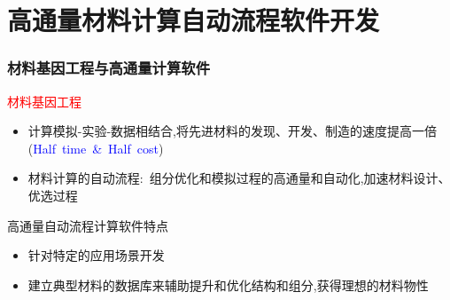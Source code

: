 \documentclass[cjk,slidestop,compress,mathserif,blue]{beamer}
\begin{document}
\section{高通量材料计算自动流程软件开发}
\frame
{
	\frametitle{材料基因工程与高通量计算软件}
		\textcolor{red}{材料基因工程}
		\begin{itemize}
			\item 计算模拟-实验-数据相结合,将先进材料的发现、开发、制造的速度提高一倍(\textcolor{blue}{\textrm{Half~time~\&~Half~cost}})
			\item 材料计算的自动流程:~组分优化和模拟过程的高通量和自动化,加速材料设计、优选过程
		\end{itemize}
		\vskip 12pt
		高通量自动流程计算软件特点
		\begin{itemize}
			\setlength{\itemsep}{10pt}
			\item 针对特定的应用场景开发
			\item 建立典型材料的数据库{\fontsize{7.2pt}{4.2pt}\selectfont{(如无机材料数据库、光电材料数据库等)}}来辅助提升和优化结构和组分,获得理想的材料物性
		\end{itemize}
}
\end{document}
